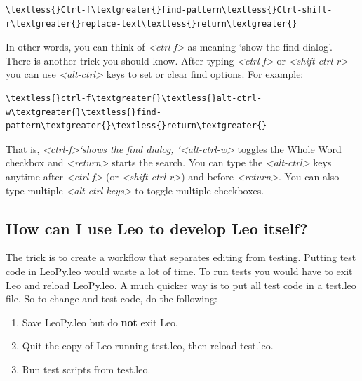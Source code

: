 \documentclass[a4paper,10pt,english]{sphinxmanual}
\begin{document}
\begin{Verbatim}[commandchars=\\\{\}]
\textless{}Ctrl-f\textgreater{}find-pattern\textless{}Ctrl-shift-r\textgreater{}replace-text\textless{}return\textgreater{}
\end{Verbatim}

In other words, you can think of \emph{\textless{}ctrl-f\textgreater{}} as meaning `show the find dialog'.
There is another trick you should know.
After typing \emph{\textless{}ctrl-f\textgreater{}} or \emph{\textless{}shift-ctrl-r\textgreater{}} you can use \emph{\textless{}alt-ctrl\textgreater{}} keys to set or clear find options.
For example:

\begin{Verbatim}[commandchars=\\\{\}]
\textless{}ctrl-f\textgreater{}\textless{}alt-ctrl-w\textgreater{}\textless{}find-pattern\textgreater{}\textless{}return\textgreater{}
\end{Verbatim}

That is, \emph{\textless{}ctrl-f\textgreater{}{}`shows the find dialog,
{}`\textless{}alt-ctrl-w\textgreater{}} toggles the Whole Word checkbox and
\emph{\textless{}return\textgreater{}} starts the search.
You can type the \emph{\textless{}alt-ctrl\textgreater{}} keys anytime after \emph{\textless{}ctrl-f\textgreater{}} (or \emph{\textless{}shift-ctrl-r\textgreater{}}) and before \emph{\textless{}return\textgreater{}}.
You can also type multiple \emph{\textless{}alt-ctrl-keys\textgreater{}} to toggle multiple checkboxes.


\subsection{How can I use Leo to develop Leo itself?}
\label{FAQ:how-can-i-use-leo-to-develop-leo-itself}
The trick is to create a workflow that separates editing from testing. Putting
test code in LeoPy.leo would waste a lot of time. To run tests you would
have to exit Leo and reload LeoPy.leo. A much quicker way is to put all test
code in a test.leo file. So to change and test code, do the following:
\begin{enumerate}
\item {} 
Save LeoPy.leo but do \textbf{not} exit Leo.

\item {} 
Quit the copy of Leo running test.leo, then reload test.leo.

\item {} 
Run test scripts from test.leo.

\end{enumerate}
\end{document}
